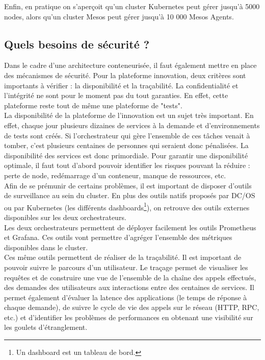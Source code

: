 \documentclass[11pt,fleqn]{book} %
\begin{document}
Enfin, en pratique on s'aperçoit qu'un cluster Kubernetes peut gérer jusqu'à 5000 nodes, alors qu'un cluster Mesos peut gérer jusqu'à 10 000 Mesos Agents.

\subsection{Quels besoins de sécurité ?}
Dans le cadre d'une architecture conteneurisée, il faut également mettre en place des mécanismes de sécurité. Pour la plateforme innovation, deux critères sont importants à vérifier : la disponibilité et la traçabilité. La confidentialité et l'intégrité ne sont pour le moment pas du tout garanties. En effet, cette plateforme reste tout de même une plateforme de "tests".\\

La disponibilité de la plateforme de l’innovation est un sujet très important. En effet, chaque jour plusieurs dizaines de services à la demande et d’environnements de tests sont créés. Si l’orchestrateur qui gère l’ensemble de ces tâches venait à tomber, c’est plusieurs centaines de personnes qui seraient donc pénalisées. La disponibilité des services est donc primordiale. Pour garantir une disponibilité optimale, il faut tout d’abord pouvoir identifier les risques pouvant la réduire : perte de node, redémarrage d’un conteneur, manque de ressources, etc. \\

Afin de se prémunir de certains problèmes, il est important de disposer d’outils de surveillance au sein du cluster. En plus des outils natifs proposés par DC/OS ou par Kubernetes (les différents dashboards\footnote{Un dashboard est un tableau de bord.}), on retrouve des outils externes disponibles sur les deux orchestrateurs.\\

Les deux orchestrateurs permettent de déployer facilement les outils Prometheus et Grafana. Ces outils vont permettre d'agréger l'ensemble des métriques disponibles dans le cluster. \\

Ces même outils permettent de réaliser de la traçabilité. Il est important de pouvoir suivre le parcours d'un utilisateur. Le traçage permet de visualiser les requêtes et de construire une vue de l’ensemble de la chaîne des appels effectués, des demandes des utilisateurs aux interactions entre des centaines de services. Il permet également d’évaluer la latence des applications (le temps de réponse à chaque demande), de suivre le cycle de vie des appels sur le réseau (HTTP, RPC, etc.) et d’identifier les problèmes de performances en obtenant une visibilité sur les goulets d’étranglement.\\
\end{document}

